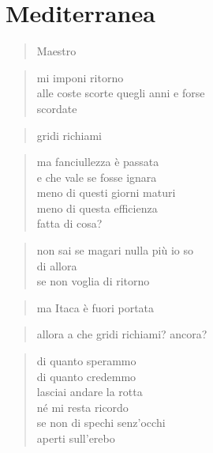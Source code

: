 \chapter{Mediterranea}
\label{mediterranea}%


\vspace*{2cm}

	\begin{verse}
		Maestro
	\end{verse}

	\begin{verse}
		mi imponi ritorno\\
		alle coste scorte quegli anni e forse\\
		scordate
	\end{verse}

	\begin{verse}
		gridi richiami
	\end{verse}

	\begin{verse}
		ma fanciullezza è passata\\
		e che vale se fosse ignara\\
		meno di questi giorni maturi\\
		meno di questa efficienza\\
		fatta di cosa?
	\end{verse}

	\begin{verse}
		non sai se magari nulla più io so\\
		di allora\\
		se non voglia di ritorno
	\end{verse}

	\begin{verse}
		ma Itaca è fuori portata
	\end{verse}

	\begin{verse}
		allora a che gridi richiami? ancora?
	\end{verse}

	\begin{verse}
		di quanto sperammo\\
		di quanto credemmo\\
		lasciai andare la rotta\\
		né mi resta ricordo\\
		se non di spechi senz’occhi\\
		aperti sull’erebo
	\end{verse}

